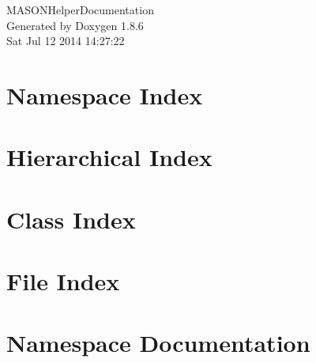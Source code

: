 \documentclass[twoside]{book}
\newcommand{\clearemptydoublepage}{%
  \newpage{\pagestyle{empty}\cleardoublepage}%
}
\begin{document}
\hypersetup{pageanchor=false}
\begin{titlepage}
\vspace*{7cm}
\begin{center}%
{\Large M\-A\-S\-O\-N\-Helper\-Documentation }\\
\vspace*{1cm}
{\large Generated by Doxygen 1.8.6}\\
\vspace*{0.5cm}
{\small Sat Jul 12 2014 14:27:22}\\
\end{center}
\end{titlepage}
\clearemptydoublepage
\tableofcontents
\clearemptydoublepage
{}
\hypersetup{pageanchor=true}

\chapter{Namespace Index}

\chapter{Hierarchical Index}

\chapter{Class Index}

\chapter{File Index}

\chapter{Namespace Documentation}














\end{document}
